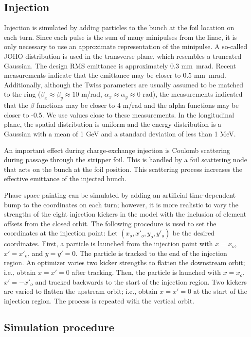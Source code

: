 \subsection{Injection}

Injection is simulated by adding particles to the bunch at the foil location on each turn. Since each pulse is the sum of many minipulses from the linac, it is only necessary to use an approximate representation of the minipulse. A so-called JOHO distribution is used in the transverse plane, which resembles a truncated Gaussian. The design RMS emittance is approximately 0.3 mm~mrad. Recent measurements indicate that the emittance may be closer to 0.5 mm~mrad. Additionally, although the Twiss parameters are usually assumed to be matched to the ring ($\beta_x \approx \beta_y \approx 10$ m/rad, $\alpha_x \approx \alpha_y \approx 0$ rad), the measurements indicated that the $\beta$ functions may be closer to 4 m/rad and the alpha functions may be closer to -0.5. We use values close to these measurements. In the longitudinal plane, the spatial distribution is uniform and the energy distribution is a Gaussian with a mean of 1 GeV and a standard deviation of less than 1 MeV.

An important effect during charge-exchange injection is Coulomb scattering during passage through the stripper foil. This is handled by a foil scattering node that acts on the bunch at the foil position. This scattering process increases the effective emittance of the injected bunch.

Phase space painting can be simulated by adding an artificial time-dependent bump to the coordinates on each turn; however, it is more realistic to vary the strengths of the eight injection kickers in the model with the inclusion of element offsets from the closed orbit. The following procedure is used to set the coordinates at the injection point: Let $(x_o, x'_o, y_o, y'_o)$ be the desired coordinates. First, a particle is launched from the injection point with $x = x_o$, $x' = x'_o$, and $y = y' = 0$. The particle is tracked to the end of the injection region. An optimizer varies two kicker strengths to flatten the downstream orbit; i.e., obtain $x = x' = 0$ after tracking. Then, the particle is launched with $x = x_o$, $x' = -x'_o$ and tracked backwards to the start of the injection region. Two kickers are varied to flatten the upstream orbit; i.e., obtain $x = x' = 0$ at the start of the injection region. The process is repeated with the vertical orbit.


\subsection{Simulation procedure}

